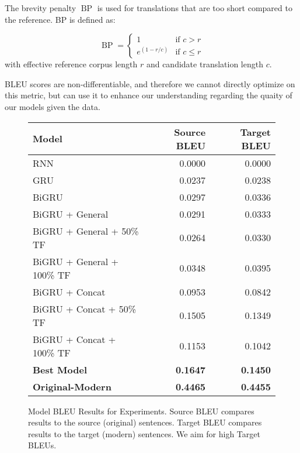 \documentclass[twoside,twocolumn]{article}
\begin{document}
The brevity penalty $\operatorname{BP}$ is used for translations that are
too short compared to the reference. BP is defined as:

\begin{equation}
  \operatorname{BP} = \begin{cases}
    1 & \text{if } c > r \\
    e^{(1-r/c)} & \text{if } c \leq r
  \end{cases}
\end{equation}
\noindent
with effective reference corpus length $r$ and candidate translation length $c$.

BLEU scores are non-differentiable, and therefore we cannot directly optimize
on this metric, but can use it to enhance our understanding regarding the
quaity of our models given the data.

\begin{figure*}
    \centering
    \begin{tabular}{ |l|r|r| }
        \hline
        \textbf{Model}
          & \textbf{Source BLEU} & \textbf{Target BLEU} \\
        \hline
        RNN                             & 0.0000 & 0.0000 \\ \hline
        GRU                             & 0.0237 & 0.0238 \\ \hline
        BiGRU                           & 0.0297 & 0.0336 \\ \hline
        BiGRU + General                 & 0.0291 & 0.0333 \\ \hline
        BiGRU + General + 50\% TF       & 0.0264 & 0.0330 \\ \hline
        BiGRU + General + 100\% TF      & 0.0348 & 0.0395 \\ \hline
        BiGRU + Concat                  & 0.0953 & 0.0842 \\ \hline
        BiGRU + Concat + 50\% TF        & 0.1505 & 0.1349 \\ \hline
        BiGRU + Concat + 100\% TF       & 0.1153 & 0.1042 \\ \hline
        \textbf{Best Model}             & \textbf{0.1647} & \textbf{0.1450} \\ \hline
        \textbf{Original-Modern}  & \textbf{0.4465} & \textbf{0.4455} \\ \hline
    \end{tabular}

    \caption{Model BLEU Results for Experiments. Source BLEU compares results
    to the source (original) sentences. Target BLEU compares results to
    the target (modern) sentences. We aim for high Target BLEUs.}
    \label{fig:model-bleu}
\end{figure*}
\end{document}

